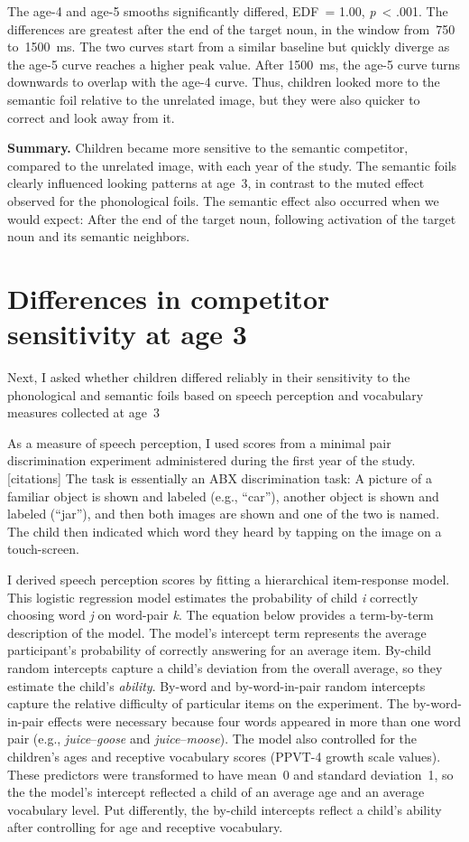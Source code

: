 \documentclass [11pt, proquest] {uwthesis}[2015/03/03]
\begin{document}
The age-4 and age-5 smooths significantly differed, EDF~= 1.00,
\emph{p}~\textless{} .001. The differences are greatest after the end of
the target noun, in the window from~750 to~1500~ms. The two curves start
from a similar baseline but quickly diverge as the age-5 curve reaches a
higher peak value. After 1500~ms, the age-5 curve turns downwards to
overlap with the age-4 curve. Thus, children looked more to the semantic
foil relative to the unrelated image, but they were also quicker to
correct and look away from it.

\textbf{Summary.} Children became more sensitive to the semantic
competitor, compared to the unrelated image, with each year of the
study. The semantic foils clearly influenced looking patterns at age~3,
in contrast to the muted effect observed for the phonological foils. The
semantic effect also occurred when we would expect: After the end of the
target noun, following activation of the target noun and its semantic
neighbors.

\section{Differences in competitor sensitivity at age
3}\label{differences-in-competitor-sensitivity-at-age-3}

Next, I asked whether children differed reliably in their sensitivity to
the phonological and semantic foils based on speech perception and
vocabulary measures collected at age~3

As a measure of speech perception, I used scores from a minimal pair
discrimination experiment administered during the first year of the
study. {[}citations{]} The task is essentially an ABX discrimination
task: A picture of a familiar object is shown and labeled (e.g.,
``car''), another object is shown and labeled (``jar''), and then both
images are shown and one of the two is named. The child then indicated
which word they heard by tapping on the image on a touch-screen.

I derived speech perception scores by fitting a hierarchical
item-response model. This logistic regression model estimates the
probability of child \emph{i} correctly choosing word \emph{j} on
word-pair \emph{k}. The equation below provides a term-by-term
description of the model. The model's intercept term represents the
average participant's probability of correctly answering for an average
item. By-child random intercepts capture a child's deviation from the
overall average, so they estimate the child's \emph{ability}. By-word
and by-word-in-pair random intercepts capture the relative difficulty of
particular items on the experiment. The by-word-in-pair effects were
necessary because four words appeared in more than one word pair (e.g.,
\emph{juice}--\emph{goose} and \emph{juice}--\emph{moose}). The model
also controlled for the children's ages and receptive vocabulary scores
(PPVT-4 growth scale values). These predictors were transformed to have
mean~0 and standard deviation~1, so the the model's intercept reflected
a child of an average age and an average vocabulary level. Put
differently, the by-child intercepts reflect a child's ability after
controlling for age and receptive vocabulary.
\end{document}
